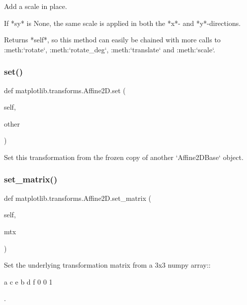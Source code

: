 \begin{DoxyVerb}Add a scale in place.

If *sy* is None, the same scale is applied in both the *x*- and
*y*-directions.

Returns *self*, so this method can easily be chained with more
calls to :meth:`rotate`, :meth:`rotate_deg`, :meth:`translate`
and :meth:`scale`.
\end{DoxyVerb}
 \mbox{\label{classmatplotlib_1_1transforms_1_1Affine2D_ae1754ccf9e53c616f1dd302d3d88de07}} 
\subsubsection{\texorpdfstring{set()}{set()}}
{\footnotesize\ttfamily def matplotlib.\+transforms.\+Affine2\+D.\+set (\begin{DoxyParamCaption}\item[{}]{self,  }\item[{}]{other }\end{DoxyParamCaption})}

\begin{DoxyVerb}Set this transformation from the frozen copy of another
`Affine2DBase` object.
\end{DoxyVerb}
 \mbox{\label{classmatplotlib_1_1transforms_1_1Affine2D_ae2d2039dbe7b7f71f963012f686965e3}} 
\subsubsection{\texorpdfstring{set\+\_\+matrix()}{set\_matrix()}}
{\footnotesize\ttfamily def matplotlib.\+transforms.\+Affine2\+D.\+set\+\_\+matrix (\begin{DoxyParamCaption}\item[{}]{self,  }\item[{}]{mtx }\end{DoxyParamCaption})}

\begin{DoxyVerb}Set the underlying transformation matrix from a 3x3 numpy array::

  a c e
  b d f
  0 0 1

.
\end{DoxyVerb}
 \mbox{\label{classmatplotlib_1_1transforms_1_1Affine2D_a134418a94062c70adbc5ba5d56b21639}} 
